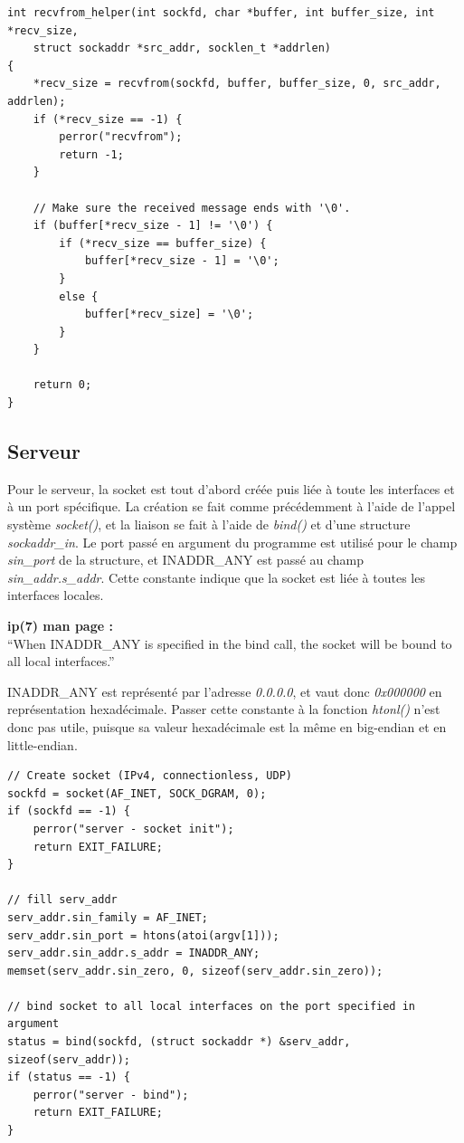 \begin{lstlisting}
int recvfrom_helper(int sockfd, char *buffer, int buffer_size, int *recv_size,
    struct sockaddr *src_addr, socklen_t *addrlen)
{
    *recv_size = recvfrom(sockfd, buffer, buffer_size, 0, src_addr, addrlen);
    if (*recv_size == -1) {
        perror("recvfrom");
        return -1;
    }

    // Make sure the received message ends with '\0'.
    if (buffer[*recv_size - 1] != '\0') {
        if (*recv_size == buffer_size) {
            buffer[*recv_size - 1] = '\0';
        }
        else {
            buffer[*recv_size] = '\0';
        }
    }

    return 0;
}
\end{lstlisting}

\subsection{Serveur}
Pour le serveur, la socket est tout d'abord créée puis liée à toute les interfaces et à un port spécifique. La création se fait comme précédemment à l'aide de l'appel système \emph{socket()}, et la liaison se fait à l'aide de \emph{bind()} et d'une structure \emph{sockaddr\_in}. Le port passé en argument du programme est utilisé pour le champ \emph{sin\_port} de la structure, et INADDR\_ANY est passé au champ \emph{sin\_addr.s\_addr}. Cette constante indique que la socket est liée à toutes les interfaces locales. \cite{cite:cmu_edu_inaddr_any} \cite{cite:man_ip}

\begin{mdframed}[backgroundcolor=lightblue, linecolor=darkblue]
\textbf{ip(7) man page :}\\
``When INADDR\_ANY is specified in the bind call, the  socket will be bound to all local interfaces.''
\end{mdframed}

\begin{mdframed}[backgroundcolor=hintbg, linecolor=hintborder]
INADDR\_ANY est représenté par l'adresse \emph{0.0.0.0}, et vaut donc \emph{0x000000} en représentation hexadécimale. Passer cette constante à la fonction \emph{htonl()} n'est donc pas utile, puisque sa valeur hexadécimale est la même en big-endian et en little-endian.
\end{mdframed}
\newpage

\begin{lstlisting}
// Create socket (IPv4, connectionless, UDP)
sockfd = socket(AF_INET, SOCK_DGRAM, 0);
if (sockfd == -1) {
    perror("server - socket init");
    return EXIT_FAILURE;
}

// fill serv_addr
serv_addr.sin_family = AF_INET;
serv_addr.sin_port = htons(atoi(argv[1]));
serv_addr.sin_addr.s_addr = INADDR_ANY;
memset(serv_addr.sin_zero, 0, sizeof(serv_addr.sin_zero));

// bind socket to all local interfaces on the port specified in argument
status = bind(sockfd, (struct sockaddr *) &serv_addr, sizeof(serv_addr));
if (status == -1) {
    perror("server - bind");
    return EXIT_FAILURE;
}
\end{lstlisting}
\


